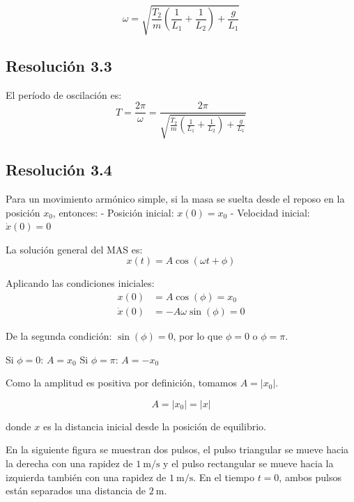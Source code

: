 \documentclass[
  11pt,
  letterpaper,
   addpoints,
   answers
  ]{exam}
\begin{document}
\begin{questions}
\begin{solution}
\begin{equation}
\boxed{\omega = \sqrt{\frac{T_2}{m}\left(\frac{1}{L_1} + \frac{1}{L_2}\right) + \frac{g}{L_1}}}
\end{equation}

\subsection*{Resolución 3.3}

El período de oscilación es:
\begin{equation}
\boxed{T = \frac{2\pi}{\omega} = \frac{2\pi}{\sqrt{\frac{T_2}{m}\left(\frac{1}{L_1} + \frac{1}{L_2}\right) + \frac{g}{L_1}}}}
\end{equation}


\subsection*{Resolución 3.4}

Para un movimiento armónico simple, si la masa se suelta desde el reposo en la posición $x_0$, entonces:
- Posición inicial: $x(0) = x_0$
- Velocidad inicial: $\dot{x}(0) = 0$

La solución general del MAS es:
\begin{equation}
x(t) = A\cos(\omega t + \phi)
\end{equation}

Aplicando las condiciones iniciales:
\begin{align}
x(0) &= A\cos(\phi) = x_0 \\
\dot{x}(0) &= -A\omega\sin(\phi) = 0
\end{align}

De la segunda condición: $\sin(\phi) = 0$, por lo que $\phi = 0$ o $\phi = \pi$.

Si $\phi = 0$: $A = x_0$
Si $\phi = \pi$: $A = -x_0$

Como la amplitud es positiva por definición, tomamos $A = |x_0|$.

\begin{equation}
\boxed{A = |x_0| = |x|}
\end{equation}

donde $x$ es la distancia inicial desde la posición de equilibrio.
\end{solution}

\question En la siguiente figura se muestran dos pulsos, el pulso triangular se mueve hacia la derecha con una rapidez de $1~\mathrm{m/s}$ y el pulso rectangular se mueve hacia la izquierda también con una rapidez de $1~\mathrm{m/s}$. En el tiempo $t=0$, ambos pulsos están separados una distancia de $2~\mathrm{m}$.


\end{questions}
\end{document}
